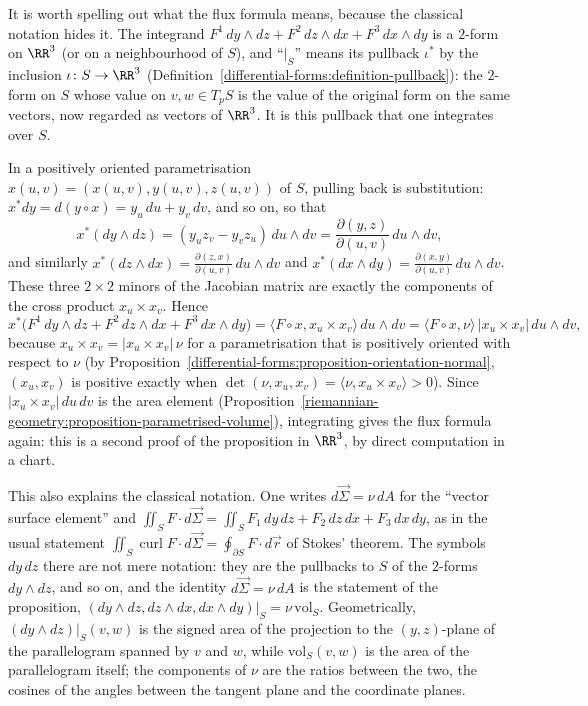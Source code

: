 \begin{remark}\label{riemannian-geometry:remark-flux-pullback}
It is worth spelling out what the flux formula means, because the classical notation hides it. The integrand $F^1\,dy \wedge dz + F^2\,dz \wedge dx + F^3\,dx \wedge dy$ is a $2$-form on $\RR^3$ (or on a
neighbourhood of $S$), and ``$|_S$'' means its pullback $\iota^*$ by the inclusion $\iota \colon S \to \RR^3$ (Definition~\ref{differential-forms:definition-pullback}): the $2$-form on $S$ whose value on
$v, w \in T_pS$ is the value of the original form on the same vectors, now regarded as vectors of $\RR^3$. It is this pullback that one integrates over $S$.

In a positively oriented parametrisation $x(u, v) = (x(u, v), y(u, v), z(u, v))$ of $S$, pulling back is substitution: $x^*dy = d(y \circ x) = y_u\,du + y_v\,dv$, and so on, so that
\[
x^*(dy \wedge dz) = (y_uz_v - y_vz_u)\,du \wedge dv = \frac{\partial(y, z)}{\partial(u, v)}\,du \wedge dv,
\]
and similarly $x^*(dz \wedge dx) = \frac{\partial(z, x)}{\partial(u, v)}\,du \wedge dv$ and $x^*(dx \wedge dy) = \frac{\partial(x, y)}{\partial(u, v)}\,du \wedge dv$. These three $2 \times 2$ minors of the Jacobian matrix are
exactly the components of the cross product $x_u \times x_v$. Hence
\[
x^*\bigl(F^1\,dy \wedge dz + F^2\,dz \wedge dx + F^3\,dx \wedge dy\bigr) = \langle F \circ x, x_u \times x_v\rangle\,du \wedge dv = \langle F \circ x, \nu\rangle\,|x_u \times x_v|\,du \wedge dv,
\]
because $x_u \times x_v = |x_u \times x_v|\,\nu$ for a parametrisation that is positively oriented with respect to $\nu$ (by Proposition~\ref{differential-forms:proposition-orientation-normal},
$(x_u, x_v)$ is positive exactly when $\det(\nu, x_u, x_v) = \langle\nu, x_u \times x_v\rangle > 0$). Since $|x_u \times x_v|\,du\,dv$ is the area element
(Proposition~\ref{riemannian-geometry:proposition-parametrised-volume}), integrating gives the flux formula again: this is a second proof of the proposition in $\RR^3$, by direct computation in a chart.

This also explains the classical notation. One writes $d\vec\Sigma = \nu\,dA$ for the ``vector surface element'' and $\iint_SF \cdot d\vec\Sigma = \iint_SF_1\,dy\,dz + F_2\,dz\,dx + F_3\,dx\,dy$, as in the usual statement
$\iint_S\operatorname{curl}F \cdot d\vec\Sigma = \oint_{\partial S}F \cdot d\vec r$ of Stokes' theorem. The symbols $dy\,dz$ there are not mere notation: they are the pullbacks to $S$ of the $2$-forms $dy \wedge dz$, and so
on, and the identity $d\vec\Sigma = \nu\,dA$ is the statement of the proposition, $(dy \wedge dz, dz \wedge dx, dx \wedge dy)|_S = \nu\,\mathrm{vol}_S$. Geometrically, $(dy \wedge dz)|_S(v, w)$ is the signed area of
the projection to the $(y, z)$-plane of the parallelogram spanned by $v$ and $w$, while $\mathrm{vol}_S(v, w)$ is the area of the parallelogram itself; the components of $\nu$ are the ratios between
the two, the cosines of the angles between the tangent plane and the coordinate planes.
\end{remark}

